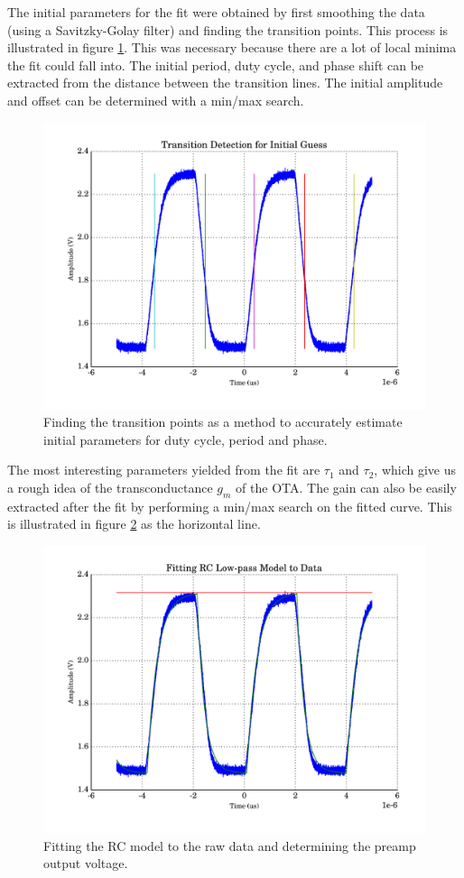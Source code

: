The initial parameters for the  fit  were obtained by first smoothing the data
(using  a  Savitzky-Golay  filter) and finding  the  transition  points.  This
process is illustrated  in  figure  \ref{fig:transition_detection}.  This  was
necessary because there are a lot of local minima the fit could fall into. The
initial period, duty cycle, and phase shift can be extracted from the distance
between the  transition  lines.  The  initial  amplitude  and  offset  can  be
determined with a min/max search.

\begin{figure}
    \centering
    \includegraphics[width=.85\linewidth]{images/plots/transition-detection.pdf}
    \caption{Finding the transition points as a method to accurately estimate initial parameters for duty cycle, period and phase.}
    \label{fig:transition_detection}
\end{figure}

The  most  interesting  parameters  yielded  from  the fit  are  $\tau_1$  and
$\tau_2$, which give us a rough idea of the transconductance $g_m$ of the OTA.
The gain can also be easily extracted after  the  fit  by performing a min/max
search   on   the   fitted   curve.   This    is    illustrated    in   figure
\ref{fig:fitting_rc_model} as the horizontal line.

\begin{figure}
    \centering
    \includegraphics[width=.85\linewidth]{images/plots/fitting_rc_model.pdf}
    \caption{Fitting the RC model to the raw data and determining the preamp output voltage.}
    \label{fig:fitting_rc_model}
\end{figure}


